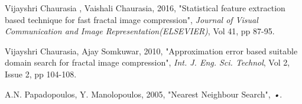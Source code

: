 \documentclass[10pt,a4paper,journal]{IEEEtran}
\begin{document}
\begin{thebibliography}{8}
 Vijayshri Chaurasia , Vaishali Chaurasia, 2016, "Statistical
feature extraction based technique for fast fractal image
compression",\textit{ Journal of Visual Communication and Image
Representation(ELSEVIER)}, Vol 41, pp 87-95.

 Vijayshri Chaurasia, Ajay Somkuwar, 2010, "Approximation error based suitable domain search for fractal image compression",\textit{ Int. J. Eng. Sci. Technol}, Vol 2, Issue 2, pp 104-108.

 A.N. Papadopoulos, Y. Manolopoulos, 2005, "Nearest Neighbour Search", \textit{•}.


\end{thebibliography}
	
\end{document}
